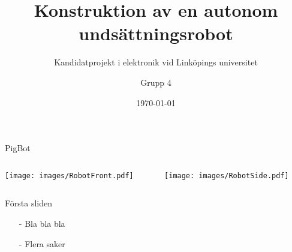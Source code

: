 \documentclass{beamer}
\title{Konstruktion av en autonom undsättningsrobot}
\subtitle{Kandidatprojekt i elektronik vid Linköpings universitet}
\author{Grupp 4}
\date{\today}
\begin{document}
\begin{frame}
  \titlepage
\end{frame}


\begin{frame}{PigBot}
  \begin{columns}
    \begin{column}{0.5\textwidth}
      \texttt{[image: images/RobotFront.pdf]}
    \end{column}%
    \begin{column}{0.5\textwidth}
      \texttt{[image: images/RobotSide.pdf]}
    \end{column}
  \end{columns}
\end{frame}

\begin{frame}{Första sliden}
  \begin{itemize}
    \item[-] Bla bla bla
      \pause
    \item[-] Flera saker
      \pause
  \end{itemize}
\end{frame}
\end{document}
